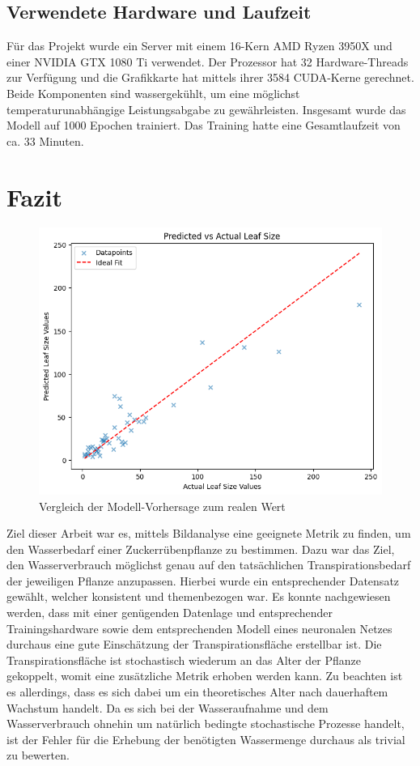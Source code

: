 \subsection{Verwendete Hardware und Laufzeit}
Für das Projekt wurde ein Server mit einem 16-Kern AMD Ryzen 3950X und einer NVIDIA GTX 1080 Ti verwendet. Der Prozessor hat 32 Hardware-Threads zur Verfügung und die Grafikkarte hat mittels ihrer 3584 CUDA-Kerne gerechnet. Beide Komponenten sind wassergekühlt, um eine möglichst temperaturunabhängige Leistungsabgabe zu gewährleisten. Insgesamt wurde das Modell auf 1000 Epochen trainiert. Das Training hatte eine Gesamtlaufzeit von ca. 33 Minuten.
\section{Fazit}
\begin{figure}
    \centering
    \includegraphics[width=0.8\linewidth]{scatter.png}
    \caption{Vergleich der Modell-Vorhersage zum realen Wert}
    \label{fig:enter-label}
\end{figure}
Ziel dieser Arbeit war es, mittels Bildanalyse eine geeignete Metrik zu finden, um den Wasserbedarf einer Zuckerrübenpflanze zu bestimmen. Dazu war das Ziel, den Wasserverbrauch möglichst genau auf den tatsächlichen Transpirationsbedarf der jeweiligen Pflanze anzupassen. Hierbei wurde ein entsprechender Datensatz gewählt, welcher konsistent und themenbezogen war. Es konnte nachgewiesen werden, dass mit einer genügenden Datenlage und entsprechender Trainingshardware sowie dem entsprechenden Modell eines neuronalen Netzes durchaus eine gute Einschätzung der Transpirationsfläche erstellbar ist. Die Transpirationsfläche ist stochastisch wiederum an das Alter der Pflanze gekoppelt, womit eine zusätzliche Metrik erhoben werden kann. Zu beachten ist es allerdings, dass es sich dabei um ein theoretisches Alter nach dauerhaftem Wachstum handelt. Da es sich bei der Wasseraufnahme und dem Wasserverbrauch ohnehin um natürlich bedingte stochastische Prozesse handelt, ist der Fehler für die Erhebung der benötigten Wassermenge durchaus als trivial zu bewerten.
